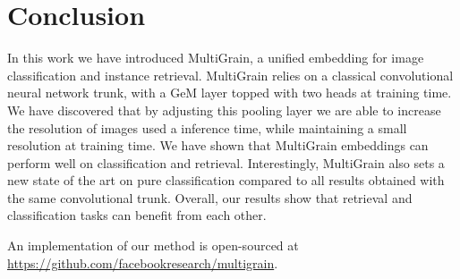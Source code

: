 %

\section{Conclusion}\label{sec:conc}
In this work we have introduced 
MultiGrain, a unified embedding for image classification and instance retrieval.
MultiGrain relies on a classical convolutional neural network trunk, with a GeM layer topped with two heads at training time.
We have discovered that by adjusting this pooling layer we are able to increase the resolution of images used a inference time, while maintaining a small resolution at training time. 
We have shown that MultiGrain embeddings can perform well on classification and retrieval. 
Interestingly, MultiGrain also sets a new state of the art on pure classification compared to all results obtained with the same convolutional trunk.
%
Overall, our results show that retrieval and classification tasks can benefit from each other. 

An implementation of our method is open-sourced at \url{https://github.com/facebookresearch/multigrain}.

%
%

